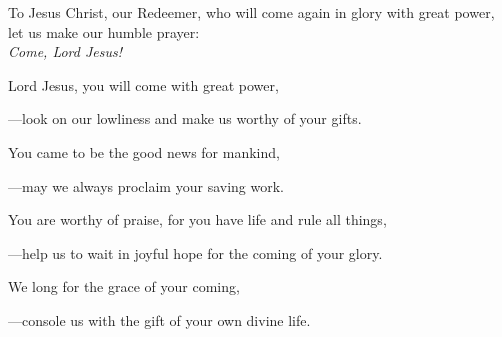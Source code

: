 \intercessions\indent

\begin{hangpar}

To Jesus Christ, our Redeemer, who will come again in glory with great power, let us make our humble prayer:\\
\emph{Come, Lord Jesus!}

\medskip Lord Jesus, you will come with great power,

{\color{red}---\thinspace}look on our lowliness and make us worthy of your gifts.

\medskip You came to be the good news for mankind,

{\color{red}---\thinspace}may we always proclaim your saving work.

\medskip You are worthy of praise, for you have life and rule all things,

{\color{red}---\thinspace}help us to wait in joyful hope for the coming of your glory.

\medskip We long for the grace of your coming,

{\color{red}---\thinspace}console us with the gift of your own divine life.

\end{hangpar}